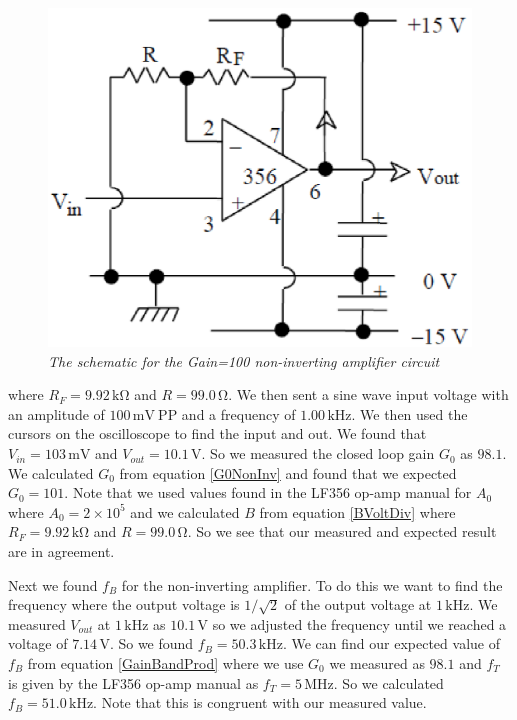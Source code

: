 \documentclass[11pt]{article}
\numberwithin{equation}{section}
\numberwithin{figure}{section}
\numberwithin{table}{section}
\newcommand{\unit}[1]{\ensuremath{\, \mathrm{#1}}}
\begin{document}
\begin{figure}[h]
\centering
\includegraphics[scale=0.60]{FigNonInvAmpSchem.eps}
\caption{\textit{The schematic for the Gain=100 non-inverting amplifier circuit}}
\label{FigNonInvAmpSchem}
\end{figure}
where $R_F=9.92\unit{k\Omega}$ and $R=99.0\unit{\Omega}$. We then sent a sine wave input voltage with an amplitude of $100\unit{mV\ PP}$ and a frequency of $1.00\unit{kHz}$. We then used the cursors on the oscilloscope to find the input and out. We found that $V_{in}=103\unit{mV}$ and $V_{out}=10.1\unit{V}$. So we measured the closed loop gain $G_0$ as $98.1$. We calculated $G_0$ from equation \ref{G0NonInv} and found that we expected $G_0 = 101$. Note that we used values found in the LF356 op-amp manual for $A_0$ where $A_0=2\times10^{5}$ and we calculated $B$ from equation \ref{BVoltDiv} where $R_F=9.92\unit{k\Omega}$ and $R=99.0\unit{\Omega}$. So we see that our measured and expected result are in agreement.

Next we found $f_B$ for the non-inverting amplifier. To do this we want to find the frequency where the output voltage is $1/\sqrt{2}$ of the output voltage at $1\unit{kHz}$. We measured $V_{out}$ at $1\unit{kHz}$ as $10.1\unit{V}$ so we adjusted the frequency until we reached a voltage of $7.14\unit{V}$. So we found $f_B = 50.3\unit{kHz}$. We can find our expected value of $f_B$ from equation \ref{GainBandProd} where we use $G_0$ we measured as $98.1$ and $f_T$ is given by the LF356 op-amp manual as $f_T = 5\unit{MHz}$. So we calculated $f_B = 51.0\unit{kHz}$. Note that this is congruent with our measured value. 
\end{document}
